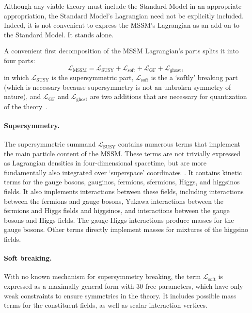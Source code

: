 Although any viable theory must include the Standard Model in an appropriate
appropriation, the Standard Model's Lagrangian need not be explicitly included.
Indeed, it is not convenient to express the MSSM's Lagrangian as an add-on to
the Standard Model. It stands alone.

A convenient first decomposition of the MSSM Lagrangian's parts splits it into
four parts:
\begin{equation}
\mathcal{L}_\mathrm{MSSM} =
\mathcal{L}_\mathrm{SUSY}
+ \mathcal{L}_\mathrm{soft}
+ \mathcal{L}_\mathrm{GF}
+ \mathcal{L}_\mathrm{ghost}
,
\end{equation}
in which
$\mathcal{L}_\mathrm{SUSY}$ is the supersymmetric part,
$\mathcal{L}_\mathrm{soft}$ is the a `softly' breaking part
(which is necessary because supersymmetry is not an unbroken symmetry of
nature),
and
$\mathcal{L}_\mathrm{GF}$ and $\mathcal{L}_\mathrm{ghost}$
are two additions that are necessary for quantization of the
theory~\cite{kuroda1999complete}.

\paragraph{Supersymmetry.}
The supersymmetric summand $\mathcal{L}_\mathrm{SUSY}$ contains numerous terms
that implement the main particle content of the MSSM.
These terms are not trivially expressed as Lagrangian densities in
four-dimensional spacetime, but are more fundamentally also integrated over
`superspace' coordinates~\cite{martin2016primer, kuroda1999complete}.
It contains kinetic terms for the gauge bosons, gauginos, fermions, sfermions,
Higgs, and higgsinos fields.
It also implements interactions between these fields,
including interactions between the fermions and gauge bosons,
Yukawa interactions between the fermions and Higgs fields and higgsinos,
and interactions between the gauge bosons and Higgs fields.
The gauge-Higgs interactions produce masses for the gauge bosons.
Other terms directly implement masses for mixtures of the higgsino fields.

\paragraph{Soft breaking.}
With no known mechanism for supersymmetry breaking,
the term $\mathcal{L}_\mathrm{soft}$ is expressed as a maximally general form
with $30$ free parameters, which have only weak constraints to ensure
symmetries in the theory.
It includes possible mass terms for the constituent fields, as well as scalar
interaction vertices.

